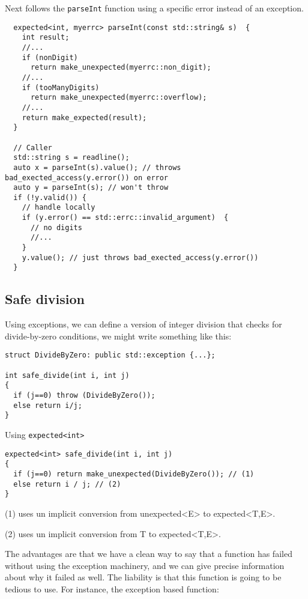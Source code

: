 \documentclass[a4paper,10pt]{article}
\newcommand{\cpp}[1]{\lstinline{#1}}
\begin{document}
Next follows the \cpp{parseInt} function using a specific error instead of an exception.

\begin{lstlisting}
  expected<int, myerrc> parseInt(const std::string& s)  {
    int result;
    //...
    if (nonDigit)  
      return make_unexpected(myerrc::non_digit);
    //...
    if (tooManyDigits)  
      return make_unexpected(myerrc::overflow);
    //...
    return make_expected(result);
  }

  // Caller
  std::string s = readline();
  auto x = parseInt(s).value(); // throws bad_exected_access(y.error()) on error
  auto y = parseInt(s); // won't throw
  if (!y.valid()) {
    // handle locally
    if (y.error() == std::errc::invalid_argument)  {
      // no digits
      //...
    }
    y.value(); // just throws bad_exected_access(y.error())
  }
\end{lstlisting}


\subsection{Safe division}

Using exceptions, we can define a version of integer division that checks for divide-by-zero conditions, we might write something like this:

\begin{lstlisting}
struct DivideByZero: public std::exception {...};

int safe_divide(int i, int j)
{
  if (j==0) throw (DivideByZero());
  else return i/j;
}
\end{lstlisting}

\noindent
Using \cpp{expected<int>}

\begin{lstlisting}
expected<int> safe_divide(int i, int j)
{
  if (j==0) return make_unexpected(DivideByZero()); // (1)
  else return i / j; // (2)
}
\end{lstlisting}

(1) uses un implicit conversion from unexpected<E> to expected<T,E>. 

(2) uses un implicit conversion from T to expected<T,E>.

The advantages are that we have a clean way to say that a function has failed without using the exception machinery, and we can give precise information about why it failed as well. The liability is that this function is going to be tedious to use. For instance, the exception based function:
\end{document}
